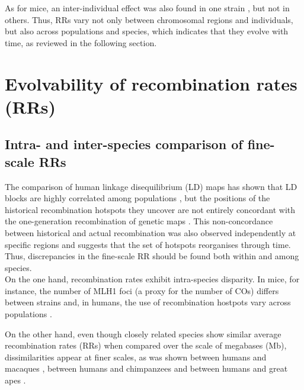 As for mice, an inter-individual effect was also found in one strain \citep{koehler2002genetic}, but not in others.
Thus, RRs vary not only between chromosomal regions and individuals, but also across populations and species, which indicates that they evolve with time, as reviewed in the following section.





\section{Evolvability of recombination rates (RRs)}

\subsection{Intra- and inter-species comparison of fine-scale RRs}

The comparison of human linkage disequilibrium (LD) maps has shown that LD blocks are highly correlated among populations \citep{gabriel2002structure}, but the positions of the historical recombination hotspots they uncover are not entirely concordant with the one-generation recombination of genetic maps \citep{tapper2005map}. 
This non-concordance between historical and actual recombination was also observed independently at specific regions \citep{jeffreys2005human,kauppi2005localized} and suggests that the set of hotspots reorganises through time.
Thus, discrepancies in the fine-scale RR should be found both within and among species.\\

On the one hand, recombination rates exhibit intra-species disparity.
In mice, for instance, the number of MLH1 foci (a proxy for the number of COs) differs between strains \citep{koehler2002genetic,paigen2008recombinational,baier2014variation} and, in humans, the use of recombination hostpots vary across populations \citep{berg2011variants,hinch2011landscape}.

On the other hand, even though closely related species show similar average recombination rates (RRs) \citep{dumont2008evolution,hassold2009cytological,garcia-cruz2011comparative,auton2012finescale} when compared over the scale of megabases (Mb), dissimilarities appear at finer scales, as was shown between humans and macaques \citep{wall2003comparative}, between humans and chimpanzees \citep{ptak2004absence,ptak2005finescale,winckler2005comparison} and between humans and great apes \citep{stevison2016time}.\\

